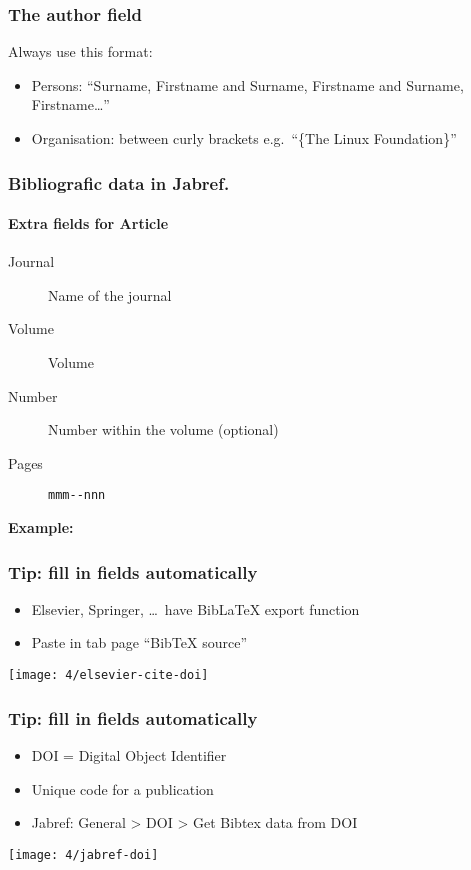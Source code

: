\documentclass[aspectratio=169]{beamer}
\begin{document}
\begin{frame}
  \frametitle{The author field}

  Always use this format:

  \begin{itemize}
    \item Persons: ``Surname, Firstname and Surname, Firstname and Surname, Firstname\ldots''
    \item Organisation: between curly brackets e.g.\ ``\{The Linux Foundation\}''
  \end{itemize}

\end{frame}

\begin{frame}[fragile]
  \frametitle{Bibliografic data in Jabref.}
  \framesubtitle{Extra fields for Article}

  \begin{description}
    \item[Journal] Name of the journal
    \item[Volume] Volume
    \item[Number] Number within the volume (optional)
    \item[Pages] \verb|mmm--nnn|
  \end{description}

  \bigskip

  \textbf{Example:}

\end{frame}

\begin{frame}
  \frametitle{Tip: fill in fields automatically}

  \begin{itemize}
    \item Elsevier, Springer, \ldots\ have Bib\LaTeX{} export function
    \item Paste in tab page ``BibTeX source''
  \end{itemize}

  \bigskip

  \centering
  \texttt{[image: 4/elsevier-cite-doi]}

\end{frame}

\begin{frame}
  \frametitle{Tip: fill in fields automatically}

  \begin{itemize}
    \item DOI = Digital Object Identifier
    \item Unique code for a publication
    \item Jabref: General > DOI > Get Bibtex data from DOI
  \end{itemize}

  \bigskip

  \centering
  \texttt{[image: 4/jabref-doi]}

\end{frame}
\end{document}
